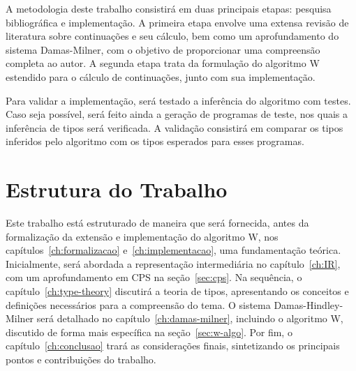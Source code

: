 A metodologia deste trabalho consistirá em duas principais etapas: pesquisa bibliográfica e implementação.
A primeira etapa envolve uma extensa revisão de literatura sobre continuações e seu cálculo, bem como um aprofundamento do sistema Damas-Milner, com o objetivo de proporcionar uma compreensão completa ao autor.
A segunda etapa trata da formulação do algoritmo W estendido para o cálculo de continuações, junto com sua implementação.

Para validar a implementação, será testado a inferência do algoritmo com testes.
Caso seja possível, será feito ainda a geração de programas de teste, nos quais a inferência de tipos será verificada.
A validação consistirá em comparar os tipos inferidos pelo algoritmo com os tipos esperados para esses programas.

\section{Estrutura do Trabalho}\label{sec:estrutura-trabalho}

Este trabalho está estruturado de maneira que será fornecida, antes da formalização da extensão e implementação do algoritmo W, nos capítulos~\ref{ch:formalizacao} e~\ref{ch:implementacao}, uma fundamentação teórica.
Inicialmente, será abordada a representação intermediária no capítulo~\ref{ch:IR}, com um aprofundamento em CPS na seção~\ref{sec:cps}.
Na sequência, o capítulo~\ref{ch:type-theory} discutirá a teoria de tipos, apresentando os conceitos e definições necessários para a compreensão do tema.
O sistema Damas-Hindley-Milner será detalhado no capítulo~\ref{ch:damas-milner}, incluindo o algoritmo W, discutido de forma mais específica na seção~\ref{sec:w-algo}.
Por fim, o capítulo~\ref{ch:conclusao} trará as considerações finais, sintetizando os principais pontos e contribuições do trabalho.
